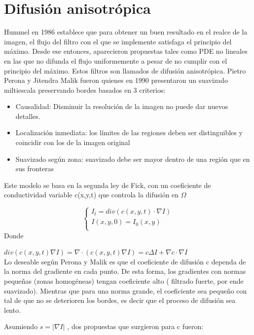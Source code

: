 \documentclass[conference]{IEEEtran}
\begin{document}
\section{Difusión anisotrópica } 
Hummel en 1986 establece que para obtener un buen resultado en el realce de la imagen, el flujo del filtro con el que se implemente satisfaga el principio del máximo. 
Desde ese entonces, aparecieron propuestas tales como PDE no lineales en las que no difunda el flujo uniformemente a pesar de no cumplir con el principio del máximo. Estos filtros son llamados de difusión anisotrópica. 
Pietro Perona y Jitendra Malik fueron quienes en 1990 presentaron un suavizado miltiescala preservando bordes basados en 3 criterios:

\begin{itemize}
  \item Causalidad: Disminuir la resolución de la imagen no puede dar nuevos detalles.
  \item Localización inmediata: los límites de las regiones deben ser distinguibles y coincidir con los de la imagen original
  \item Suavizado según zona: suavizado debe ser mayor dentro de una región que en sus fronteras
\end{itemize}

Este modelo se basa en la segunda ley de Fick, con un coeficiente de conductividad variable c(x,y,t) que controla la difusión en $\Omega$

  \[
    \left\{
                \begin{array}{ll}
                  I_t = div(c(x,y,t)\cdot \nabla I) \\
                  I(x,y,0) = I_0(x,y)\\
                \end{array}
              \right.
  \]
Donde 

$div(c(x,y,t) \nabla I) = \nabla \cdot (c(x,y,t) \nabla I) =c\Delta I + \nabla c \cdot \nabla I$
\\


Lo deseable según Perona y Malik es que el coeficiente de difusión c dependa de la norma del gradiente en cada punto. De esta forma, los gradientes con normas pequeñas (zonas homogéneas) tengan coeficiente alto ( filtrado fuerte, por ende suavizado). Mientras que para una norma grande, el coeficiente sea pequeño con tal de que no se deterioren los bordes, es decir que el proceso de difusión sea lento.

Asumiendo $s= |\nabla I|$ , dos propuestas que surgieron para c fueron:
\end{document}
